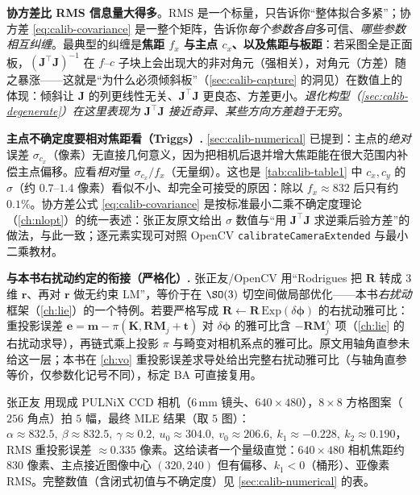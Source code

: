\begin{insight}
\textbf{协方差比 RMS 信息量大得多}。RMS 是一个标量，只告诉你“整体拟合多紧”；协方差 \cref{eq:calib-covariance} 是一整个矩阵，告诉你\emph{每个参数各自}多可信、\emph{哪些参数相互纠缠}。最典型的纠缠是\textbf{焦距 $f_x$ 与主点 $c_x$、以及焦距与板距}：若采图全是正面板，$(\mathbf{J}^\top\mathbf{J})^{-1}$ 在 $f$--$c$ 子块上会出现大的非对角元（强相关），对角元（方差）随之暴涨——这就是“为什么必须倾斜板”（\cref{sec:calib-capture} 的洞见）在数值上的体现：倾斜让 $\mathbf{J}$ 的列更线性无关、$\mathbf{J}^\top\mathbf{J}$ 更良态、方差更小。\emph{退化构型（\cref{sec:calib-degenerate}）在这里表现为 $\mathbf{J}^\top\mathbf{J}$ 接近奇异、某些方向方差趋于无穷}。
\end{insight}

\begin{note}
\textbf{主点不确定度要相对焦距看（Triggs\cite{triggs1998autocalib}）.}\;
\cref{sec:calib-numerical} 已提到：主点的\emph{绝对}误差 $\sigma_{c_x}$（像素）无直接几何意义，因为把相机后退并增大焦距能在很大范围内补偿主点偏移。应看\emph{相对}量 $\sigma_{c_x}/f_x$（无量纲）。这也是 \cref{tab:calib-table1} 中 $c_x,c_y$ 的 $\sigma$（约 $0.7$--$1.4$ 像素）看似不小、却完全可接受的原因：除以 $f_x\approx832$ 后只有约 $0.1\%$。协方差公式 \cref{eq:calib-covariance} 是按标准最小二乘不确定度理论（\cref{ch:nlopt}）的统一表述：张正友原文给出 $\sigma$ 数值与“用 $\mathbf{J}^\top\mathbf{J}$ 求逆乘后验方差”的做法，与此一致；逐元素实现可对照 OpenCV \texttt{calibrateCameraExtended} 与最小二乘教材。
\end{note}

\begin{note}
\textbf{与本书右扰动约定的衔接（严格化）.}\;
张正友/OpenCV 用“Rodrigues 把 $\mathbf{R}$ 转成 $3$ 维 $\mathbf{r}$、再对 $\mathbf{r}$ 做无约束 LM”，等价于在 $\SO(3)$ 切空间做局部优化——本书\emph{右扰动}框架（\cref{ch:lie}）的一个特例。若要严格写成 $\mathbf{R}\leftarrow\mathbf{R}\,\mathrm{Exp}(\delta\boldsymbol{\phi})$ 的右扰动雅可比：重投影误差 $\mathbf{e}=\mathbf{m}-\pi(\mathbf{K},\mathbf{R}\mathbf{M}_j+\mathbf{t})$ 对 $\delta\boldsymbol{\phi}$ 的雅可比含 $-\mathbf{R}\mathbf{M}_j^\wedge$ 项（\cref{ch:lie} 的右扰动求导），再链式乘上投影 $\pi$ 与畸变对相机系点的雅可比。原文用轴角直参未给这一层；本书在 \cref{ch:vo} 重投影误差求导处给出完整右扰动雅可比（与轴角直参等价，仅参数化记号不同），标定 BA 可直接复用。
\end{note}

\begin{example}[一个真实标定结果长什么样]\label{ex:calib-real-result}
张正友\cite{zhang2000calibration} 用现成 PULNiX CCD 相机（$6\,\mathrm{mm}$ 镜头、$640\times480$），$8\times8$ 方格图案（$256$ 角点）拍 $5$ 幅，最终 MLE 结果（取 $5$ 图）：$\alpha\approx832.5,\ \beta\approx832.5,\ \gamma\approx0.2,\ u_0\approx304.0,\ v_0\approx206.6,\ k_1\approx-0.228,\ k_2\approx0.190$，RMS 重投影误差 $\approx0.335$ 像素。这给读者一个量级直觉：$640\times480$ 相机焦距约 $830$ 像素、主点接近图像中心 $(320,240)$ 但有偏移、$k_1<0$（桶形）、亚像素 RMS。完整数值（含闭式初值与不确定度）见 \cref{sec:calib-numerical} 的表。
\end{example}

